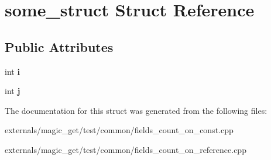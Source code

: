\hypertarget{structsome__struct}{}\section{some\+\_\+struct Struct Reference}
\label{structsome__struct}
\subsection*{Public Attributes}
\begin{DoxyCompactItemize}
\item 
\mbox{\label{structsome__struct_a072a7f4783a34ebfeaecc118919028ae}} 
int {\bfseries i}
\item 
\mbox{\label{structsome__struct_a614fe957b4870c094b99e4fd3247df6c}} 
int {\bfseries j}
\end{DoxyCompactItemize}


The documentation for this struct was generated from the following files\+:\begin{DoxyCompactItemize}
\item 
externals/magic\+\_\+get/test/common/fields\+\_\+count\+\_\+on\+\_\+const.\+cpp\item 
externals/magic\+\_\+get/test/common/fields\+\_\+count\+\_\+on\+\_\+reference.\+cpp\end{DoxyCompactItemize}
